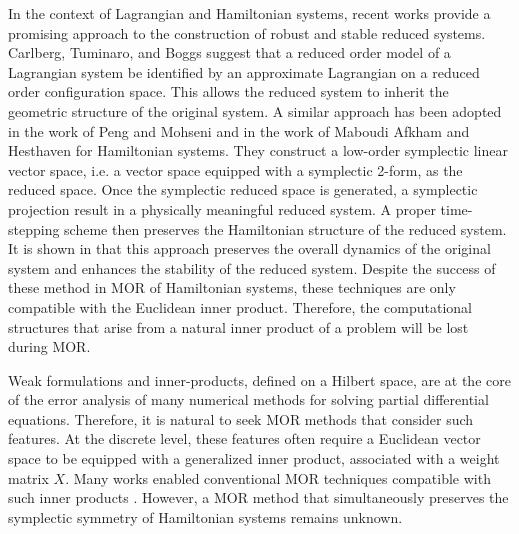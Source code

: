 In the context of Lagrangian and Hamiltonian systems, recent works provide a promising approach to the construction of robust and stable reduced systems. Carlberg, Tuminaro, and Boggs \cite{doi:10.1137/140959602} suggest that a reduced order model of a Lagrangian system be identified by an approximate Lagrangian on a reduced order configuration space. This allows the reduced system to inherit the geometric structure of the original system. A similar approach has been adopted in the work of Peng and Mohseni \cite{doi:10.1137/140978922} and in the work of Maboudi Afkham and Hesthaven \cite{doi:10.1137/17M1111991} for Hamiltonian systems. They construct a low-order symplectic linear vector space, i.e. a vector space equipped with a symplectic 2-form, as the reduced space. Once the symplectic reduced space is generated, a symplectic projection result in a physically meaningful reduced system. A proper time-stepping scheme then preserves the Hamiltonian structure of the reduced system. It is shown in \cite{doi:10.1137/17M1111991,doi:10.1137/140978922} that this approach preserves the overall dynamics of the original system and enhances the stability of the reduced system. Despite the success of these method in MOR of Hamiltonian systems, these techniques are only compatible with the Euclidean inner product. Therefore, the computational structures that arise from a natural inner product of a problem will be lost during MOR.

Weak formulations and inner-products, defined on a Hilbert space, are at the core of the error analysis of many numerical methods for solving partial differential equations. Therefore, it is natural to seek MOR methods that consider such features. At the discrete level, these features often require a Euclidean vector space to be equipped with a generalized inner product, associated with a weight matrix $X$. Many works enabled conventional MOR techniques compatible with such inner products \cite{sen2006natural}. However, a MOR method that simultaneously preserves the symplectic symmetry of Hamiltonian systems remains unknown. 

